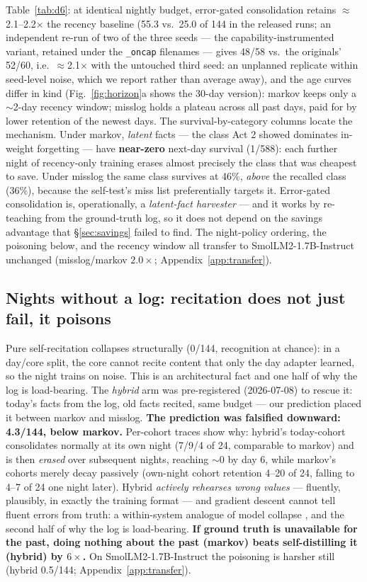 \documentclass[11pt]{article}
\newcommand{\smol}{SmolLM2-1.7B-Instruct}
\begin{document}
Table~\ref{tab:d6}: at identical nightly budget, error-gated consolidation retains
$\approx$2.1--2.2$\times$ the recency baseline (55.3 vs.\ 25.0 of 144 in the released runs; an
independent re-run of two of the three seeds --- the capability-instrumented variant, retained
under the \texttt{\_oncap} filenames --- gives 48/58 vs.\ the originals' 52/60, i.e.\ $\approx$2.1$\times$
with the untouched third seed: an unplanned replicate within seed-level noise, which we report
rather than average away), and the age curves differ in kind
(Fig.~\ref{fig:horizon}a shows the 30-day version): markov keeps only a $\sim$2-day recency
window; misslog holds a plateau across all past days, paid for by lower retention of the newest
days. The survival-by-category columns locate the mechanism. Under markov, \emph{latent} facts
--- the class Act 2 showed dominates in-weight forgetting --- have \textbf{near-zero} next-day
survival (1/588): each further night of recency-only training erases almost precisely the class
that was cheapest to save. Under misslog the same class survives at 46\%, \emph{above} the recalled
class (36\%), because the self-test's miss list preferentially targets it. Error-gated
consolidation is, operationally, a \emph{latent-fact harvester} --- and it works by re-teaching
from the ground-truth log, so it does not depend on the savings advantage that
\S\ref{sec:savings} failed to find. The night-policy ordering, the poisoning below, and the
recency window all transfer to \smol{} unchanged (misslog/markov $2.0\times$;
Appendix~\ref{app:transfer}).

\subsection{Nights without a log: recitation does not just fail, it poisons}\label{sec:nolog}

Pure self-recitation collapses structurally (0/144, recognition at chance): in a day/core split,
the core cannot recite content that only the day adapter learned, so the night trains on noise.
This is an architectural fact and one half of why the log is load-bearing. The \emph{hybrid} arm
was pre-registered (2026-07-08) to rescue it: today's facts from the log, old facts recited,
same budget --- our prediction placed it between markov and misslog. \textbf{The prediction was
falsified downward: 4.3/144, below markov.} Per-cohort traces show why: hybrid's today-cohort
consolidates normally at its own night (7/9/4 of 24, comparable to markov) and is then
\emph{erased} over subsequent nights, reaching $\sim$0 by day 6, while markov's cohorts merely
decay passively (own-night cohort retention 4--20 of 24, falling to 4--7 of 24 one night
later). Hybrid \emph{actively rehearses wrong values}
--- fluently, plausibly, in exactly the training format --- and gradient descent cannot tell
fluent errors from truth: a within-system analogue of model collapse \citep{shumailov2024}, and
the second half of why the log is load-bearing. \textbf{If ground truth is unavailable for the
past, doing nothing about the past (markov) beats self-distilling it (hybrid) by $6\times$.} On
\smol{} the poisoning is harsher still (hybrid 0.5/144; Appendix~\ref{app:transfer}).
\end{document}
